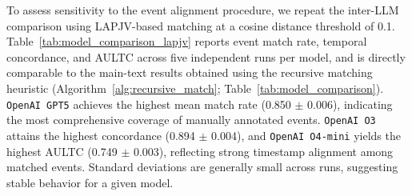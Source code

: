 \documentclass[pdflatex,sn-mathphys-num]{sn-jnl}%
\theoremstyle{thmstyleone}%
\theoremstyle{thmstyletwo}%
\theoremstyle{thmstylethree}%
\begin{document}
To assess sensitivity to the event alignment procedure, we repeat the inter-LLM comparison using LAPJV-based matching at a cosine distance threshold of 0.1. Table~\ref{tab:model_comparison_lapjv} reports event match rate, temporal concordance, and AULTC across five independent runs per model, and is directly comparable to the main-text results obtained using the recursive matching heuristic (Algorithm~\ref{alg:recursive_match}; Table~\ref{tab:model_comparison}).
\texttt{OpenAI GPT5} achieves the highest mean match rate (0.850 $\pm$ 0.006), indicating the most comprehensive coverage of manually annotated events. \texttt{OpenAI O3} attains the highest concordance (0.894 $\pm$ 0.004), and \texttt{OpenAI O4-mini} yields the highest AULTC (0.749 $\pm$ 0.003), reflecting strong timestamp alignment among matched events. Standard deviations are generally small across runs, suggesting stable behavior for a given model.
\end{document}
